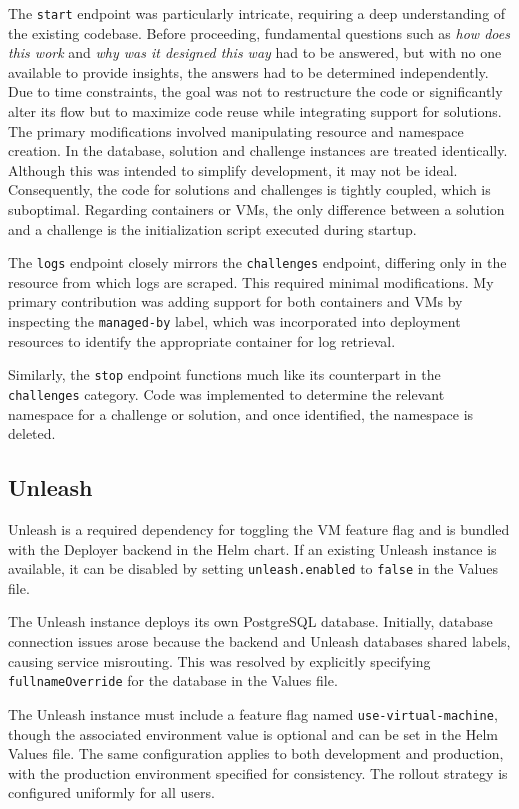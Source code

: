 The \texttt{start} endpoint was particularly intricate, requiring a deep understanding of the existing codebase. Before proceeding, fundamental questions such as \textit{how does this work} and \textit{why was it designed this way} had to be answered, but with no one available to provide insights, the answers had to be determined independently. Due to time constraints, the goal was not to restructure the code or significantly alter its flow but to maximize code reuse while integrating support for solutions. The primary modifications involved manipulating resource and namespace creation. In the database, solution and challenge instances are treated identically. Although this was intended to simplify development, it may not be ideal. Consequently, the code for solutions and challenges is tightly coupled, which is suboptimal. Regarding containers or VMs, the only difference between a solution and a challenge is the initialization script executed during startup.

The \texttt{logs} endpoint closely mirrors the \texttt{challenges} endpoint, differing only in the resource from which logs are scraped. This required minimal modifications. My primary contribution was adding support for both containers and VMs by inspecting the \texttt{managed-by} label, which was incorporated into deployment resources to identify the appropriate container for log retrieval.

Similarly, the \texttt{stop} endpoint functions much like its counterpart in the \texttt{challenges} category. Code was implemented to determine the relevant namespace for a challenge or solution, and once identified, the namespace is deleted.

\subsection{Unleash}
Unleash is a required dependency for toggling the VM feature flag and is bundled with the Deployer backend in the Helm chart. If an existing Unleash instance is available, it can be disabled by setting \texttt{unleash.enabled} to \texttt{false} in the Values file.

The Unleash instance deploys its own PostgreSQL database. Initially, database connection issues arose because the backend and Unleash databases shared labels, causing service misrouting. This was resolved by explicitly specifying \texttt{fullnameOverride} for the database in the Values file.

The Unleash instance must include a feature flag named \texttt{use-virtual-machine}, though the associated environment value is optional and can be set in the Helm Values file. The same configuration applies to both development and production, with the production environment specified for consistency. The rollout strategy is configured uniformly for all users.

